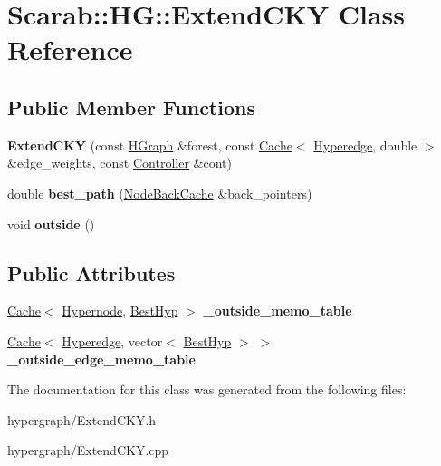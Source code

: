 \hypertarget{class_scarab_1_1_h_g_1_1_extend_c_k_y}{
\section{Scarab::HG::ExtendCKY Class Reference}
\label{class_scarab_1_1_h_g_1_1_extend_c_k_y}
}
\subsection*{Public Member Functions}
\begin{DoxyCompactItemize}
\item 
\hypertarget{class_scarab_1_1_h_g_1_1_extend_c_k_y_a393c61229e019cb875ba6b7b6b176aff}{
{\bfseries ExtendCKY} (const \hyperlink{class_scarab_1_1_h_g_1_1_h_graph}{HGraph} \&forest, const \hyperlink{class_cache}{Cache}$<$ \hyperlink{class_scarab_1_1_h_g_1_1_hyperedge}{Hyperedge}, double $>$ \&edge\_\-weights, const \hyperlink{class_scarab_1_1_h_g_1_1_controller}{Controller} \&cont)}
\label{class_scarab_1_1_h_g_1_1_extend_c_k_y_a393c61229e019cb875ba6b7b6b176aff}

\item 
\hypertarget{class_scarab_1_1_h_g_1_1_extend_c_k_y_ae72fa6e6e0bb69464c575bd5225b1423}{
double {\bfseries best\_\-path} (\hyperlink{class_cache}{NodeBackCache} \&back\_\-pointers)}
\label{class_scarab_1_1_h_g_1_1_extend_c_k_y_ae72fa6e6e0bb69464c575bd5225b1423}

\item 
\hypertarget{class_scarab_1_1_h_g_1_1_extend_c_k_y_a038f64197127bc278e6a25c4565c72bd}{
void {\bfseries outside} ()}
\label{class_scarab_1_1_h_g_1_1_extend_c_k_y_a038f64197127bc278e6a25c4565c72bd}

\end{DoxyCompactItemize}
\subsection*{Public Attributes}
\begin{DoxyCompactItemize}
\item 
\hypertarget{class_scarab_1_1_h_g_1_1_extend_c_k_y_a008898035d6c06258e25a502fbfd7377}{
\hyperlink{class_cache}{Cache}$<$ \hyperlink{class_scarab_1_1_h_g_1_1_hypernode}{Hypernode}, \hyperlink{class_scarab_1_1_h_g_1_1_best_hyp}{BestHyp} $>$ {\bfseries \_\-outside\_\-memo\_\-table}}
\label{class_scarab_1_1_h_g_1_1_extend_c_k_y_a008898035d6c06258e25a502fbfd7377}

\item 
\hypertarget{class_scarab_1_1_h_g_1_1_extend_c_k_y_a554aa074d56b38acb561fda8584b9b8a}{
\hyperlink{class_cache}{Cache}$<$ \hyperlink{class_scarab_1_1_h_g_1_1_hyperedge}{Hyperedge}, vector$<$ \hyperlink{class_scarab_1_1_h_g_1_1_best_hyp}{BestHyp} $>$ $>$ {\bfseries \_\-outside\_\-edge\_\-memo\_\-table}}
\label{class_scarab_1_1_h_g_1_1_extend_c_k_y_a554aa074d56b38acb561fda8584b9b8a}

\end{DoxyCompactItemize}


The documentation for this class was generated from the following files:\begin{DoxyCompactItemize}
\item 
hypergraph/ExtendCKY.h\item 
hypergraph/ExtendCKY.cpp\end{DoxyCompactItemize}
